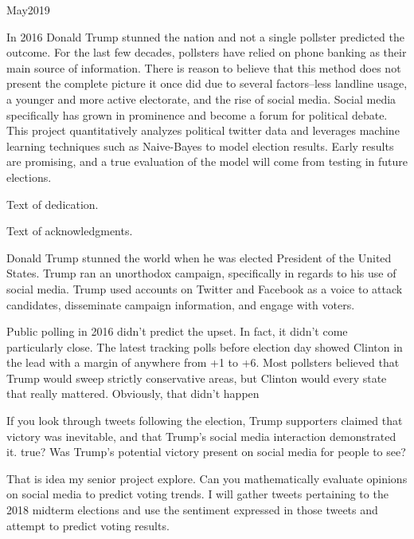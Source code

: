 \documentclass[11pt, twoside, reqno]{book}
\begin{document}
    {May}{2019}

\abstr

In 2016 Donald Trump stunned the nation and not a single pollster predicted the outcome. For the last few decades, pollsters have relied on phone banking as their main source of information. There is reason to believe that this method does not present the complete picture it once did due to several factors--less landline usage, a younger and more active electorate, and the rise of social media. Social media specifically has grown in prominence and become a forum for political debate. This project quantitatively analyzes political twitter data and leverages machine learning techniques such as Naive-Bayes to model election results. Early results are promising, and a true evaluation of the model will come from testing in future elections. 

\tableofcontents

\dedic

Text of dedication.

\acknowl

Text of acknowledgments.

\startmain


\intro
\hspace{0.2in}Donald Trump stunned the world when he was elected President of the United States. Trump ran an unorthodox campaign, specifically in regards to his use of social media. Trump used accounts on Twitter and Facebook as a voice to attack candidates, disseminate campaign information, and engage with voters. 

Public polling in 2016 didn’t predict the upset. In fact, it didn’t come particularly close. The latest tracking polls before election day showed Clinton in the lead with a margin of anywhere from +1 to +6. Most pollsters believed that Trump would sweep strictly conservative areas, but Clinton would every state that really mattered. Obviously, that didn’t happen

If you look through tweets following the election, Trump supporters claimed that victory was inevitable, and that Trump’s social media interaction demonstrated it. true? Was Trump’s potential victory present on social media for people to see? 

That is idea my senior project explore. Can you mathematically evaluate opinions on social media to predict voting trends. I will gather tweets pertaining to the 2018 midterm elections and use the sentiment expressed in those tweets and attempt to predict voting results. 
\end{document}
